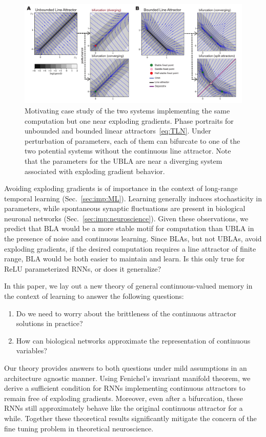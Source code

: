 \documentclass{article} %
\newcounter{ct}
\theoremstyle{definition}
\theoremstyle{remark}
\begin{document}
\begin{figure}[tbhp]
  \centering
  \includegraphics[width=\textwidth]{UBLABLA}
  \caption{Motivating case study of the two systems implementing the same computation but one near exploding gradients.
    Phase portraits for unbounded and bounded linear attractors~\eqref{eq:TLN}.
    Under perturbation of parameters, each of them can bifurcate to one of the two potential systems without the continuous line attractor.
    Note that the parameters for the UBLA are near a diverging system associated with exploding gradient behavior.
}
  \label{fig:ublabla}
\end{figure}

Avoiding exploding gradients is of importance in the context of long-range temporal learning (Sec.~\ref{sec:imp:ML}).
Learning generally induces stochasticity in parameters, while spontaneous synaptic fluctuations are present in biological neuronal networks (Sec.~\ref{sec:imp:neuroscience}).
Given these observations, we predict that BLA would be a more stable motif for computation than UBLA in the presence of noise and continuous learning.
Since BLAs, but not UBLAs, avoid exploding gradients, if the desired computation requires a line attractor of finite range, BLA would be both easier to maintain and learn.
Is this only true for ReLU parameterized RNNs, or does it generalize?

In this paper, we lay out a new theory of general continuous-valued memory in the context of learning to answer the following questions:
\begin{enumerate}
    \item Do we need to worry about the brittleness of the continuous attractor solutions in practice?
    \item How can biological networks approximate the representation of continuous variables?
\end{enumerate}
Our theory provides answers to both questions under mild assumptions in an architecture agnostic manner.
Using Fenichel's invariant manifold theorem, we derive a sufficient condition for RNNs implementing continuous attractors to remain free of exploding gradients.
Moreover, even after a bifurcation, these RNNs still approximately behave like the original continuous attractor for a while.
Together these theoretical results significantly mitigate the concern of the fine tuning problem in theoretical neuroscience.
\end{document}
